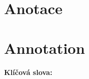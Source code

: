 ﻿\section*{Anotace\label{abstract}}



\vspace{1cm}

\vfill


\section*{Annotation}



\vspace{1cm}

\noindent\textbf{\bf Klíčová slova\?:} 

\vspace{1cm} 
